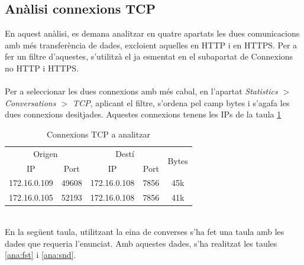 \documentclass{article}
\begin{document}
\subsection{Anàlisi connexions TCP}
En aquest anàlisi, es demana analitzar en quatre apartats les dues comunicacions
amb més transferència de dades, excloient aquelles en HTTP i en HTTPS. Per a 
fer un filtre d'aquestes, s'utilitzà el ja esmentat en el subapartat de Connexions
no HTTP i HTTPS.\\
\\
Per a seleccionar les dues connexions amb més cabal, en l'apartat
\textit{Statistics $>$ Conversations $>$ TCP}, aplicant el filtre,
s'ordena pel camp bytes i s'agafa les dues connexions desitjades.
Aquestes connexions tenens les IPs de la taula \ref{ana:conn}\\
\begin{table}[!h]
\centering
\begin{tabular}{|c|c|c|c|c|}
\hline
\multicolumn{2}{|c|}{Origen} & \multicolumn{2}{c|}{Destí} 
&\multirow{2}{*}{Bytes}
\\
\cline{1-4}
IP &Port &IP &Port &\\
\hline
172.16.0.109 &49608 &172.16.0.108 &7856 &45k
\\
\hline
172.16.0.105 &52193 &172.16.0.108 &7856 &41k
\\
\hline
\end{tabular}
\caption{Connexions TCP a analitzar}
\label{ana:conn}
\end{table}\\
En la següent taula, utilitzant la eina de converses s'ha fet una taula amb
les dades que requeria l'enunciat. Amb aquestes dades, s'ha realitzat les taules
\ref{ana:fst} i \ref{ana:snd}.\\\\
\end{document}
